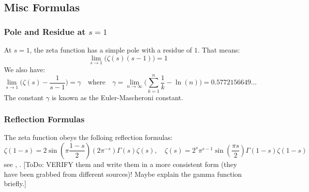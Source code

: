 \documentclass[12pt]{article}
\begin{document}
\subsection{Misc Formulas}

\subsubsection{Pole and Residue at $s=1$}
At $s = 1$, the zeta function has a simple pole with a residue of $1$. That means:
\begin{equation}
\lim_{s \rightarrow 1} \bigl( \zeta(s)  (s-1) \bigr) = 1
\end{equation}
We also have:
\begin{equation}
\lim_{s \rightarrow 1} \bigl( \zeta(s) - \frac{1}{s-1} \bigr) = \gamma
\quad \text{where} \quad
\gamma 
= \lim_{n \rightarrow \infty} \bigl( \sum_{k=1}^n \frac{1}{k} - \ln(n) \bigr)
= 0.5772156649 \ldots
\end{equation}
The constant $\gamma$ is known as the Euler-Mascheroni constant.

\subsubsection{Reflection Formulas}
The zeta function obeys the folloing reflection formulas:
\begin{equation}
\zeta(1-s) = 2 \sin(\pi \frac{1-s}{2})(2 \pi^{-s}) \Gamma(s) \zeta(s), \quad
\zeta(s) = 2^s \pi^{s-1} \sin(\frac{\pi s}{2}) \Gamma(1-s) \zeta(1-s)
\end{equation}
see \cite{Boost}, \cite{Wiki}. [ToDo: VERIFY them and write them in a more consistent form (they have been grabbed from different sources)! Maybe explain the gamma function briefly.]
\end{document}
